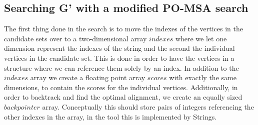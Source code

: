 \documentclass[thesis.tex]{subfiles}
\begin{document}
\subsection{Searching G' with a modified PO-MSA search}
The first thing done in the search is to move the indexes of the vertices in the candidate sets over to a two-dimensional array $indexes$ where we let one dimension represent the indexes of the string and the second the individual vertices in the candidate set. This is done in order to have the vertices in a structure where we can reference them solely by an index. In addition to the $indexes$ array we create a floating point array $scores$ with exactly the same dimensions, to contain the scores for the individual vertices. Additionally, in order to backtrack and find the optimal alignment, we create an equally sized $backpointer$ array. Conceptually this should store pairs of integers referencing the other indexes in the array, in the tool this is implemented by Strings.
\par\noindent
\end{document}
